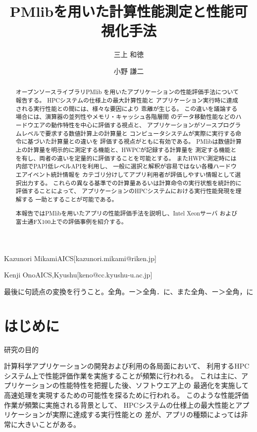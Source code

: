 \documentclass[submit,techrep,noauthor]{ipsj}
\begin{document}
\title{PMlibを用いた計算性能測定と性能可視化手法}


\author{三上 和徳}{Kazunori Mikami}{AICS}[kazunori.mikami@riken.jp]
\author{小野 謙二}{Kenji Ono}{AICS,Kyushu}[keno@cc.kyushu-u.ac.jp]

\begin{abstract}
オープンソースライブラリPMlib
を用いたアプリケーションの性能評価手法について報告する。
HPCシステムの仕様上の最大計算性能と
アプリケーション実行時に達成される実行性能との間には、様々な要因により
乖離が生じる。
この違いを議論する場合には、演算器の並列性やメモリ・キャッシュ各階層間
のデータ移動性能などのハードウエアの動作特性を中心に評価する視点と、
アプリケーションがソースプログラムレベルで要求する数値計算上の計算量と
コンピュータシステムが実際に実行する命令に基づいた計算量との違いを
評価する視点がともに有効である。
PMlibは数値計算上の計算量を明示的に測定する機能と、HWPCが記録する計算量を
測定する機能とを有し、両者の違いを定量的に評価することを可能とする。
またHWPC測定時には内部でPAPI低レベルAPIを利用し、
一般に選択と解釈が容易ではない各種ハードウエアイベント統計情報を
カテゴリ分けしてアプリ利用者が評価しやすい情報として選択出力する。
%
%
これらの異なる基準での計算量あるいは計算命令の実行状態を統計的に
評価することによって、
アプリケーションのHPCシステムにおける実行性能発現を理解する
一助とすることが可能である。

本報告ではPMlibを用いたアプリの性能評価手法を説明し、Intel Xeonサーバ
および富士通FX100上での評価事例を紹介する。
\end{abstract}

\maketitle

{ \color{blue}
最後に句読点の変換を行うこと。全角。ー＞全角．に、また全角、ー＞全角，に\\
}

\section{はじめに}
研究の目的

計算科学アプリケーションの開発および利用の各局面において、
利用するHPCシステム上で性能評価作業を実施することが頻繁に行われる。
これは主に、アプリケーションの性能特性を把握した後、ソフトウエア上の
最適化を実施して高速処理を実現するための可能性を探るために行われる。
このような性能評価作業が頻繁に実施される背景として、
HPCシステムの仕様上の最大性能とアプリケーションが実際に達成する実行性能との
差が、アプリの種類によっては非常に大きいことがある。
\end{document}

